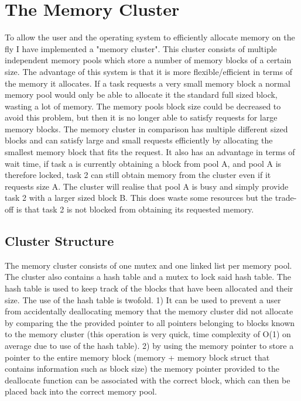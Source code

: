 \documentclass[12pt,a4paper]{article}
\begin{document}
\section{The Memory Cluster}
To allow the user and the operating system to efficiently allocate memory on the fly I have implemented a "memory cluster". This cluster consists of multiple independent memory pools which store a number of memory blocks of a certain size. The advantage of this system is that it is more flexible/efficient in terms of the memory it allocates. If a task requests a very small memory block a normal memory pool would only be able to allocate it the standard full sized block, wasting a lot of memory. The memory pools block size could be decreased to avoid this problem, but then it is no longer able to satisfy requests for large memory blocks. The memory cluster in comparison has multiple different sized blocks and can satisfy large and small requests efficiently by allocating the smallest memory block that fits the request. It also has an advantage in terms of wait time, if task a is currently obtaining a block from pool A, and pool A is therefore locked, task 2 can still obtain memory from the cluster even if it requests size A. The cluster will realise that pool A is busy and simply provide task 2 with a larger sized block B. This does waste some resources but the trade-off is that task 2 is not blocked from obtaining its requested memory.\\

\subsection{Cluster Structure}
The memory cluster consists of one mutex and one linked list per memory pool. The cluster also contains a hash table and a mutex to lock said hash table. The hash table is used to keep track of the blocks that have been allocated and their size. The use of the hash table is twofold. 1) It can be used to prevent a user from accidentally deallocating memory that the memory cluster did not allocate by comparing the the provided pointer to all pointers belonging to blocks known to the memory cluster (this operation is very quick, time complexity of O(1) on average due to use of the hash table). 2) by using the memory pointer to store a pointer to the entire memory block (memory + memory block struct that contains information such as block size) the memory pointer provided to the deallocate function can be associated with the correct block, which can then be placed back into the correct memory pool.
\end{document}

